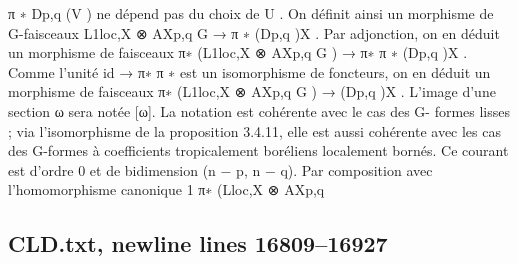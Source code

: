 \documentclass[
  10pt,
]{article}
\newenvironment{Shaded}{}{}
\newcommand{\NormalTok}[1]{#1}
\begin{document}
\begin{Shaded}
\begin{Highlighting}[]
\NormalTok{π ∗ Dp,q (V ) ne dépend pas du choix de U . On définit ainsi un morphisme de G{-}faisceaux}
\NormalTok{                                L1loc,X ⊗ AXp,q}
\NormalTok{                                             G}
\NormalTok{                                                → π ∗ (Dp,q )X .}
\NormalTok{Par adjonction, on en déduit un morphisme de faisceaux}
\NormalTok{                            π∗ (L1loc,X ⊗ AXp,q}
\NormalTok{                                             G}
\NormalTok{                                                ) → π∗ π ∗ (Dp,q )X .}
\NormalTok{Comme l’unité id → π∗ π ∗ est un isomorphisme de foncteurs, on en déduit un morphisme}
\NormalTok{de faisceaux}
\NormalTok{                               π∗ (L1loc,X ⊗ AXp,q}
\NormalTok{                                                G}
\NormalTok{                                                   ) → (Dp,q )X .}
\NormalTok{   L’image d’une section ω sera notée [ω]. La notation est cohérente avec le cas des G{-}}
\NormalTok{formes lisses ; via l’isomorphisme de la proposition 3.4.11, elle est aussi cohérente avec}
\NormalTok{les cas des G{-}formes à coefficients tropicalement boréliens localement bornés. Ce courant}
\NormalTok{est d’ordre 0 et de bidimension (n − p, n − q).}
\NormalTok{   Par composition avec l’homomorphisme canonique}
\NormalTok{                               1}
\NormalTok{                         π∗ (Lloc,X ⊗ AXp,q}
\end{Highlighting}
\end{Shaded}

\subsection{CLD.txt, newline lines
16809--16927}\label{cld.txt-newline-lines-1680916927}
\end{document}
